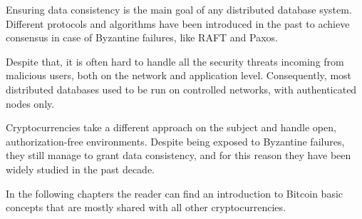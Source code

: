 Ensuring data consistency is the main goal of any distributed database system. Different protocols and algorithms have been introduced in the past to achieve consensus in case of Byzantine failures, like RAFT and Paxos.

Despite that, it is often hard to handle all the security threats incoming from malicious users, both on the network and application level. Consequently, most distributed databases used to be run on controlled networks, with authenticated nodes only.

Cryptocurrencies take a different approach on the subject and handle open, authorization-free environments. Despite being exposed to Byzantine failures, they still manage to grant data consistency, and for this reason they have been widely studied in the past decade.

In the following chapters the reader can find an introduction to Bitcoin basic concepts that are mostly shared with all other cryptocurrencies.

